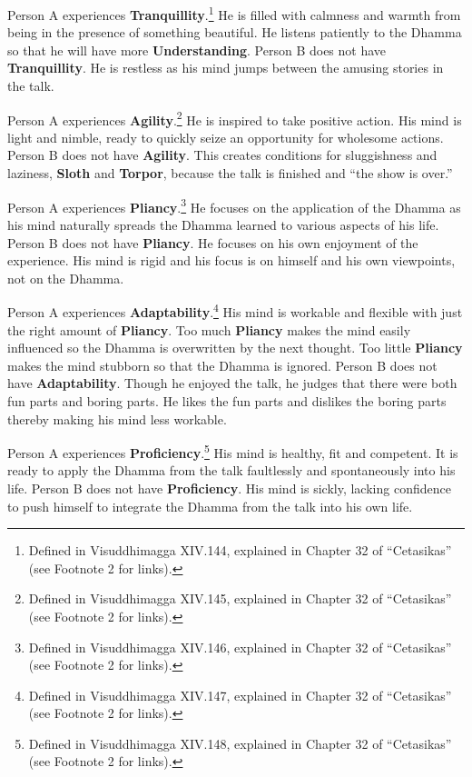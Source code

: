Person A experiences \textbf{Tranquillity}.\footnote{Defined in Visuddhimagga XIV.144, explained in Chapter 32 of “Cetasikas” (see Footnote 2 for links).} He is filled with calmness and warmth from being in the presence of something beautiful. He listens patiently to the Dhamma so that he will have more \textbf{Understanding}. Person B does not have \textbf{Tranquillity}. He is restless as his mind jumps between the amusing stories in the talk.

Person A experiences \textbf{Agility}.\footnote{Defined in Visuddhimagga XIV.145, explained in Chapter 32 of “Cetasikas” (see Footnote 2 for links).} He is inspired to take positive action. His mind is light and nimble, ready to quickly seize an opportunity for wholesome actions. Person B does not have \textbf{Agility}. This creates conditions for sluggishness and laziness, \textbf{Sloth} and \textbf{Torpor}, because the talk is finished and “the show is over.”

Person A experiences \textbf{Pliancy}.\footnote{Defined in Visuddhimagga XIV.146, explained in Chapter 32 of “Cetasikas” (see Footnote 2 for links).} He focuses on the application of the Dhamma as his mind naturally spreads the Dhamma learned to various aspects of his life. Person B does not have \textbf{Pliancy}. He focuses on his own enjoyment of the experience. His mind is rigid and his focus is on himself and his own viewpoints, not on the Dhamma.

Person A experiences \textbf{Adaptability}.\footnote{Defined in Visuddhimagga XIV.147, explained in Chapter 32 of “Cetasikas” (see Footnote 2 for links).} His mind is workable and flexible with just the right amount of \textbf{Pliancy}. Too much \textbf{Pliancy} makes the mind easily influenced so the Dhamma is overwritten by the next thought. Too little \textbf{Pliancy} makes the mind stubborn so that the Dhamma is ignored. Person B does not have \textbf{Adaptability}. Though he enjoyed the talk, he judges that there were both fun parts and boring parts. He likes the fun parts and dislikes the boring parts thereby making his mind less workable.

Person A experiences \textbf{Proficiency}.\footnote{Defined in Visuddhimagga XIV.148, explained in Chapter 32 of “Cetasikas” (see Footnote 2 for links).} His mind is healthy, fit and competent. It is ready to apply the Dhamma from the talk faultlessly and spontaneously into his life. Person B does not have \textbf{Proficiency}. His mind is sickly, lacking confidence to push himself to integrate the Dhamma from the talk into his own life.


